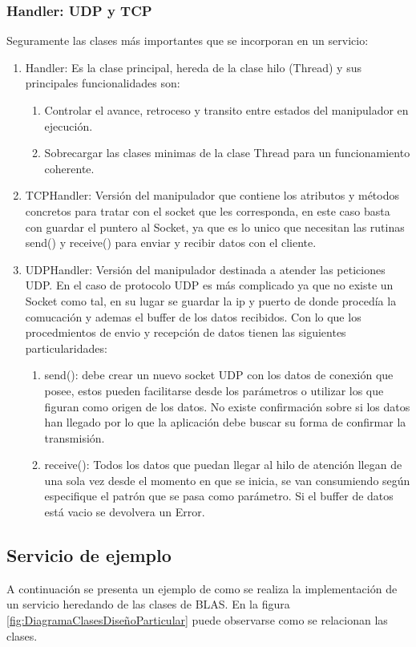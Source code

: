 \documentclass[a4paper,spanish,12pt]{book}
\begin{document}
\subsubsection{Handler: UDP y TCP}
Seguramente las clases más importantes que se incorporan en un servicio:
\begin{enumerate}
	\item Handler: Es la clase principal, hereda de la clase hilo (Thread) y sus principales funcionalidades son:
		\begin{enumerate}
			\item Controlar el avance, retroceso y transito entre estados del manipulador en ejecución.
			\item Sobrecargar las clases minimas de la clase Thread para un funcionamiento coherente.
		\end{enumerate}
	\item TCPHandler: Versión del manipulador que contiene los atributos y m\'etodos concretos para tratar con el socket que les corresponda, en este caso basta con guardar el puntero al Socket, ya que es lo unico que necesitan las rutinas send() y receive() para enviar y recibir datos con el cliente.
	\item UDPHandler: Versión del manipulador destinada a atender las peticiones UDP. En el caso de protocolo UDP es más complicado ya que no existe un Socket como tal, en su lugar se guardar la ip y puerto de donde procedía la comucación y ademas el buffer de los datos recibidos. Con lo que los procedmientos de envio y recepción de datos tienen las siguientes particularidades:
		\begin{enumerate}
			\item send(): debe crear un nuevo socket UDP con los datos de conexión que posee, estos pueden facilitarse desde los parámetros o utilizar los que figuran como origen de los datos. No existe confirmación sobre si los datos han llegado por lo que la aplicación debe buscar su forma de confirmar la transmisión.
			\item receive(): Todos los datos que puedan llegar al hilo de atención llegan de una sola vez desde el momento en que se inicia, se van consumiendo según especifique el patrón que se pasa como parámetro. Si el buffer de datos está vacio se devolvera un Error.
		\end{enumerate}
\end{enumerate}
\subsection{Servicio de ejemplo}
A continuación se presenta un ejemplo de como se realiza la implementación de un servicio heredando de las clases de BLAS. En la figura \ref{fig:DiagramaClasesDiseñoParticular} puede observarse como se relacionan las clases.
\end{document}
